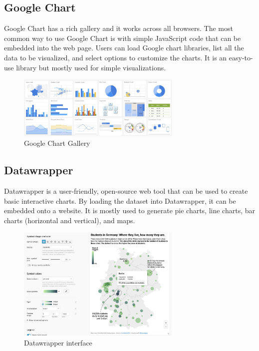 \subsection{Google Chart}
Google Chart has a rich gallery and it works across all browsers.
The most common way to use Google Chart is with simple JavaScript code that can be embedded into the web page. Users can load Google chart libraries, list all the data to be visualized, and select options to customize the charts. It is an easy-to-use library but mostly used for simple visualizations.

\begin{figure}[H]
\centering
\captionsetup{justification=centering}
\includegraphics[width=0.7\textwidth]{./pics/charts.png}
\caption{Google Chart Gallery \cite{googlechart}}
\label{fig:google-chart}
\end{figure}

\newpage

\subsection{Datawrapper}
Datawrapper is a user-friendly, open-source web tool that can be used to create basic interactive charts. By loading the dataset into Datawrapper, it can be embedded onto a website. It is mostly used to generate pie charts, line charts, bar charts (horizontal and vertical), and maps. 

\begin{figure}[H]
\centering
\captionsetup{justification=centering}
\includegraphics[width=0.7\textwidth]{./pics/datar.png}
\caption{Datawrapper interface \cite{datawrapper}}
\label{fig:datawrapper}
\end{figure}

